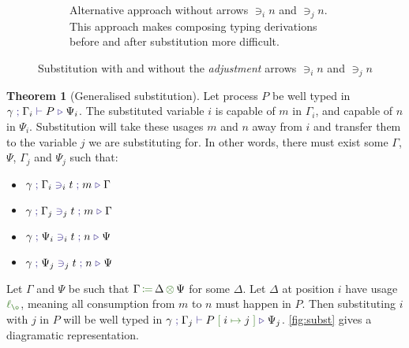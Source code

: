 \documentclass[a4paper,UKenglish,cleveref,autoref,thm-restate,authorcolumns]{lipics-v2019}
\theoremstyle{definition}
\newtheorem{nitheorem}{Theorem}
\newcommand{\type}[1]{\textcolor{BlueViolet}{\operatorname{#1}}}
\newcommand{\func}[1]{\textcolor{OliveGreen}{\operatorname{#1}}}
\newcommand{\subst}[3]{#1 \; \func{[} \; #3 \; \func{\mapsto} \;#2 \; \func{]}}
\newcommand{\opctx}[3]{#1 \, \func{\coloneqq} \, #2 \, \func{\otimes} \, #3}
\newcommand{\lz}{\func{\ell_{\o}}}
\newcommand{\types}[4]{#1 \; \type{;} \; #2 \; \type{\vdash} \; #3 \; \type{\triangleright} \; #4}
\newcommand{\contains}[6]{#1 \; \type{;} \; #2 \; \type{\ni}_{#3} \; #4 \; \type{;} \; #5 \; \type{\triangleright} \; #6}
\begin{document}
\begin{figure}[h]
\begin{subfigure}{.4\textwidth}
    \caption{
      Alternative approach without arrows $\ni_i n$ and $\ni_j n$.
      This approach makes composing typing derivations before and after substitution more difficult.
    }
    \label{fig:subst-alternative}
  \end{subfigure}
  \caption{Substitution with and without the \emph{adjustment} arrows $\ni_i n$ and $\ni_j n$}
\end{figure}

\begin{nitheorem}[Generalised substitution]
  \label{thm:subst-generalization}
  Let process $P$ be well typed in $\types{\gamma}{\Gamma_i}{P}{\Psi_i}$.
  The substituted variable $i$ is capable of $m$ in $\Gamma_i$, and capable of $n$ in $\Psi_i$.
  Substitution will take these usages $m$ and $n$ away from $i$ and transfer them to the variable $j$ we are substituting for.
  In other words, there must exist some $\Gamma$, $\Psi$, $\Gamma_j$ and $\Psi_j$ such that:
  \begin{multicols}{2}
  \begin{itemize}
    \item $\contains{\gamma}{\Gamma_i}{i}{t}{m}{\Gamma}$
    \item $\contains{\gamma}{\Gamma_j}{j}{t}{m}{\Gamma}$
    \item $\contains{\gamma}{\Psi_i}{i}{t}{n}{\Psi}$
    \item $\contains{\gamma}{\Psi_j}{j}{t}{n}{\Psi}$
  \end{itemize}
  \end{multicols}
  Let $\Gamma$ and $\Psi$ be such that $\opctx{\Gamma}{\Delta}{\Psi}$ for some $\Delta$.
  Let $\Delta$ at position $i$ have usage $\lz$, meaning all consumption from $m$ to $n$ must happen in $P$.
  Then substituting $i$ with $j$ in $P$ will be well typed in $\types{\gamma}{\Gamma_j}{\subst{P}{j}{i}}{\Psi_j}$.
  \autoref{fig:subst} gives a diagramatic representation.
\end{nitheorem}
\end{document}

